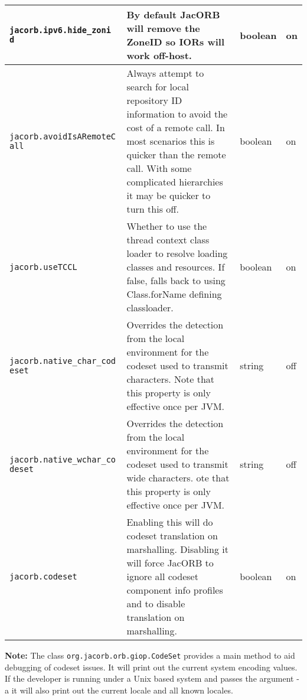 \begin{small}
\begin{longtable}{|p{5cm}|p{7.5cm}|p{1.5cm}|p{1.5cm}|}
\hline
\verb"jacorb.ipv6.hide_zoni"
\verb"d" &
By default JacORB will remove the ZoneID so IORs will work off-host. & boolean & on\\
\hline
\verb"jacorb.avoidIsARemoteC"
\verb"all" & Always attempt to search for local repository ID information to avoid
the cost of a remote call. In most scenarios this is quicker than the remote call.
With some complicated hierarchies it may be quicker to turn this off. & boolean & on\\
\hline
\verb"jacorb.useTCCL" &
Whether to use the thread context class loader to resolve loading classes and resources.
If false, falls back to using Class.forName defining classloader. & boolean & on\\
\hline
\verb"jacorb.native_char_cod"
\verb"eset" & Overrides the detection from the local environment for the codeset
used to transmit characters. Note that this property is only effective once per
JVM. & string & off\\
\hline
\verb"jacorb.native_wchar_co"
\verb"deset" & Overrides the detection from the local environment for the codeset
used to transmit wide characters. ote that this property is only effective once per
JVM. & string & off\\
\hline
\verb"jacorb.codeset" &
Enabling this will do codeset translation on marshalling. Disabling it will force
JacORB to ignore all codeset component info profiles and to disable translation on
marshalling. & boolean & on\\
\hline
\end{longtable}
\end{small}

\textbf{Note:} The class {\tt org.jacorb.orb.giop.CodeSet} provides a main method to
aid debugging of codeset issues. It will print out the current system encoding values.
If the developer is running under a Unix based system and passes the argument -a it will
also print out the current locale and all known locales.


